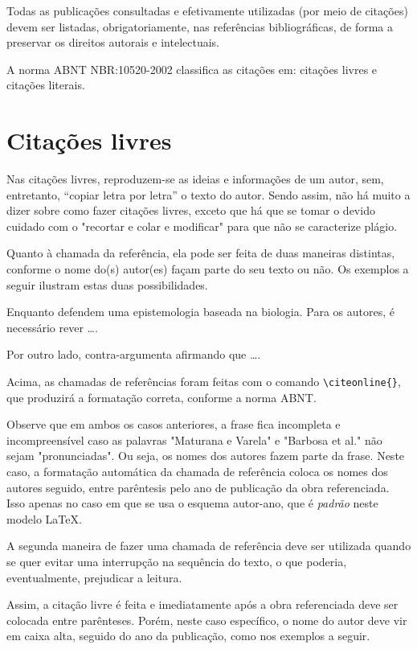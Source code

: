 \begin{apendicesenv}
Todas as publicações consultadas e efetivamente utilizadas (por meio de citações) devem ser listadas, obrigatoriamente, nas referências bibliográficas, de forma a preservar os direitos autorais e intelectuais.

A norma ABNT NBR:10520-2002 classifica as citações em: citações livres e citações literais.

\section{Citações livres}
\label{sec:citacoes_livres}

Nas citações livres, reproduzem-se as ideias e informações de um autor, sem, entretanto, ``copiar letra por letra'' o texto do autor. Sendo assim, não há muito a dizer sobre como fazer citações livres, exceto que há que se tomar o devido cuidado com o "recortar e colar e modificar"{} para que não se caracterize plágio.

Quanto à chamada da referência, ela pode ser feita de duas maneiras distintas, conforme o nome do(s) autor(es) façam parte do seu texto ou não. Os exemplos a seguir ilustram estas duas possibilidades.

Enquanto  defendem uma epistemologia baseada na biologia. Para os autores, é necessário rever \ldots.

Por outro lado,  contra-argumenta afirmando que \ldots.

Acima, as chamadas de referências foram feitas com o comando \verb|\citeonline{}|, que produzirá a formatação correta, conforme a norma ABNT.

Observe que em ambos os casos anteriores, a frase fica incompleta e incompreensível caso as palavras "Maturana e Varela"{} e "Barbosa et al."{} não sejam "pronunciadas"{}. Ou seja, os nomes dos autores fazem parte da frase. Neste caso, a formatação automática da chamada de referência coloca os nomes dos autores seguido, entre parêntesis pelo ano de publicação da obra referenciada. Isso apenas no caso em que se usa o esquema autor-ano, que é \textit{padrão} neste modelo \LaTeX{}.

A segunda maneira de fazer uma chamada de referência deve ser utilizada quando se quer evitar uma interrupção na sequência do texto, o que poderia, eventualmente, prejudicar a leitura.

Assim, a citação livre é feita e imediatamente após a obra referenciada deve ser colocada entre parênteses. Porém, neste caso específico, o nome do autor deve vir em caixa alta, seguido do ano da publicação, como nos exemplos a seguir.


\end{apendicesenv}
